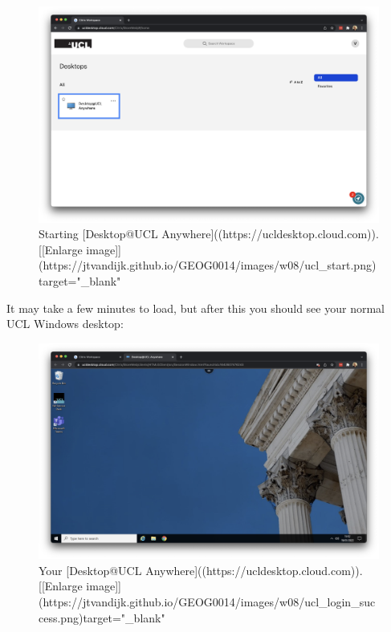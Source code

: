 \documentclass[
]{book}
\begin{document}
\begin{figure}

{\centering \includegraphics[width=850pt]{images/w08/ucl_start} 

}

\caption{Starting [Desktop@UCL Anywhere]((https://ucldesktop.cloud.com)). [[Enlarge image]](https://jtvandijk.github.io/GEOG0014/images/w08/ucl_start.png){target="_blank"}}\label{fig:ucl-desktop-start}
\end{figure}

It may take a few minutes to load, but after this you should see your normal UCL Windows desktop:

\begin{figure}

{\centering \includegraphics[width=850pt]{images/w08/ucl_login_success} 

}

\caption{Your [Desktop@UCL Anywhere]((https://ucldesktop.cloud.com)). [[Enlarge image]](https://jtvandijk.github.io/GEOG0014/images/w08/ucl_login_success.png){target="_blank"}}\label{fig:ucl-desktop-login-success}
\end{figure}
\end{document}
